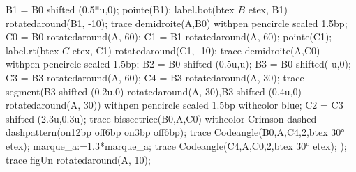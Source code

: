 \begin{changemargin}{0mm}{-25mm}
\begin{methode}
\begin{Geometrie}[CoinHD={(8.5u,5u)}]
                B1 = B0 shifted (0.5*u,0);
                pointe(B1);
                label.bot(btex $B$ etex, B1)  rotatedaround(B1, -10);
                trace demidroite(A,B0) withpen pencircle scaled 1.5bp;
                C0 = B0 rotatedaround(A, 60);
                C1 = B1 rotatedaround(A, 60);
                pointe(C1);
                label.rt(btex $C$ etex, C1)  rotatedaround(C1, -10);            
                trace demidroite(A,C0) withpen pencircle scaled 1.5bp;
                B2 = B0 shifted (0.5u,u);
                B3 = B0 shifted(-u,0);
                C3 = B3 rotatedaround(A, 60);
                C4 = B3 rotatedaround(A, 30);
                trace segment(B3 shifted (0.2u,0) rotatedaround(A, 30),B3 shifted (0.4u,0) rotatedaround(A, 30)) withpen pencircle scaled 1.5bp withcolor blue;
                C2 = C3 shifted (2.3u,0.3u);
                trace bissectrice(B0,A,C0) withcolor Crimson dashed dashpattern(on12bp off6bp on3bp off6bp);
                trace Codeangle(B0,A,C4,2,btex \ang{30} etex);
                marque_a:=1.3*marque_a;
                trace Codeangle(C4,A,C0,2,btex \ang{30} etex);
            );
            trace figUn rotatedaround(A, 10);
        \end{Geometrie}
    \end{methode}


\end{changemargin}
